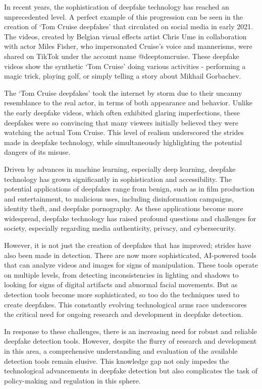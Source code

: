 In recent years, the sophistication of deepfake technology has reached an unprecedented level. 
A perfect example of this progression can be seen in the creation of `Tom Cruise deepfakes' 
that circulated on social media in early 2021. The videos, created by Belgian visual effects 
artist Chris Ume in collaboration with actor Miles Fisher, who impersonated Cruise's voice 
and mannerisms, were shared on TikTok under the account name @deeptomcruise. These deepfake 
videos show the synthetic `Tom Cruise' doing various activities - performing a magic trick, 
playing golf, or simply telling a story about Mikhail Gorbachev.

The `Tom Cruise deepfakes' took the internet by storm due to their uncanny resemblance to the 
real actor, in terms of both appearance and behavior. Unlike the early deepfake videos, which 
often exhibited glaring imperfections, these deepfakes were so convincing that many viewers 
initially believed they were watching the actual Tom Cruise. This level of realism underscored 
the strides made in deepfake technology, while simultaneously highlighting the potential 
dangers of its misuse.

Driven by advances in machine learning, especially deep learning, deepfake technology has
grown significantly in sophistication and accessibility. The potential applications of
deepfakes range from benign, such as in film production and entertainment, to malicious uses,
including disinformation campaigns, identity theft, and deepfake pornography. As these
applications become more widespread, deepfake technology has raised profound questions and
challenges for society, especially regarding media authenticity, privacy, and cybersecurity.

However, it is not just the creation of deepfakes that has improved; strides have also been made 
in detection. There are now more sophisticated, \ac{AI}-powered tools that can analyze videos 
and images for signs of manipulation. These tools operate on multiple levels, from detecting 
inconsistencies in lighting and shadows to looking for signs of digital artifacts and abnormal 
facial movements. But as detection tools become more sophisticated, so too do the techniques 
used to create deepfakes. This constantly evolving technological arms race underscores the 
critical need for ongoing research and development in deepfake detection.

In response to these challenges, there is an increasing need for robust and reliable
deepfake detection tools. However, despite the flurry of research and development in this
area, a comprehensive understanding and evaluation of the available detection tools remain
elusive. This knowledge gap not only impedes the technological advancements in deepfake
detection but also complicates the task of policy-making and regulation in this sphere.

